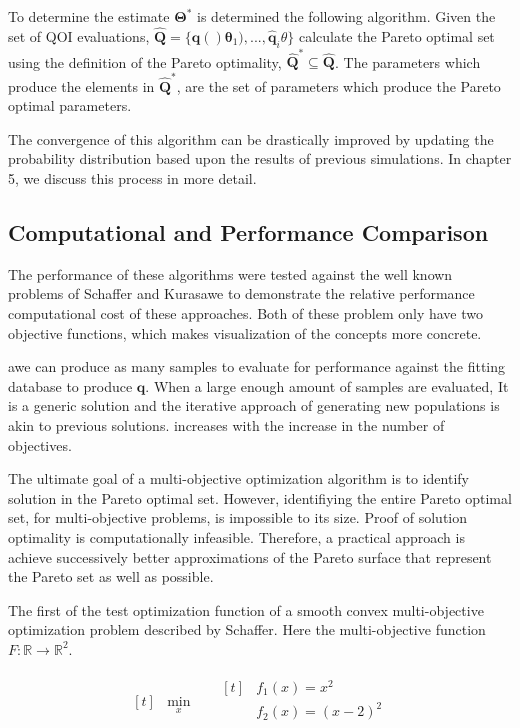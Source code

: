To determine the estimate $\bm{\Theta}^*$ is determined the following algorithm.  Given the set of QOI evaluations, $\hat{\bm{Q}}=\{\hat{\bm{q}}()\bm{\theta}_1),...,\hat{\bm{q}}_i{\theta}\}$ calculate the Pareto optimal set using the definition of the Pareto optimality, $\hat{\bm{Q}}^* \subseteq \hat{\bm{Q}}$.   The parameters which produce the elements in $\hat{\bm{Q}}^*$, are the set of parameters which produce the Pareto optimal parameters.

The convergence of this algorithm can be drastically improved by updating the probability distribution based upon the results of previous simulations.  In chapter 5, we discuss this process in more detail.

\subsection{Computational and Performance Comparison}
 The performance of these algorithms were tested against the well known problems of Schaffer\cite{schaffer1984_pareto} and Kurasawe\cite{kursawe1991_pareto} to demonstrate the relative performance computational cost of these approaches.  Both of these problem only have two objective functions, which makes visualization of the concepts more concrete.

 awe can produce as many samples to evaluate for performance against the fitting database to produce $\bm{q}.$  When a large enough amount of samples are evaluated,
 It is a generic solution and the iterative approach of generating new populations is akin to previous solutions.
 increases with the increase in the number of objectives.

 The ultimate goal of a multi-objective optimization algorithm is to identify solution in the Pareto optimal set.  However, identifiying the entire Pareto optimal set, for multi-objective problems, is impossible to its size.  Proof of solution optimality is computationally infeasible.  Therefore, a practical approach is achieve successively better approximations of the Pareto surface that represent the Pareto set as well as possible.

 The first of the test optimization function of a smooth convex multi-objective optimization problem described by Schaffer\cite{schaffer1984_pareto}.  Here the multi-objective function $F:\mathbb{R} \rightarrow \mathbb{R}^2$.

 \begin{equation}
 \begin{aligned}[t]
   &\min_{x} \quad
      &\begin{aligned}[t]
            &f_1(x) = x^2 \\
            &f_2(x) = (x-2)^2 \\
       \end{aligned}
 \end{aligned}
 \end{equation}

